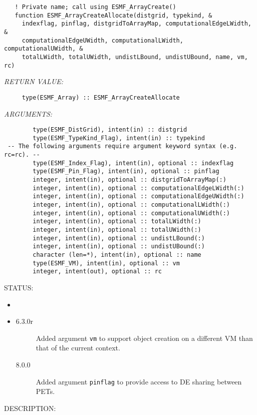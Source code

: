 \begin{verbatim}   ! Private name; call using ESMF_ArrayCreate()
   function ESMF_ArrayCreateAllocate(distgrid, typekind, &
     indexflag, pinflag, distgridToArrayMap, computationalEdgeLWidth, &
     computationalEdgeUWidth, computationalLWidth, computationalUWidth, &
     totalLWidth, totalUWidth, undistLBound, undistUBound, name, vm, rc)\end{verbatim}{\em RETURN VALUE:}
\begin{verbatim}     type(ESMF_Array) :: ESMF_ArrayCreateAllocate\end{verbatim}{\em ARGUMENTS:}
\begin{verbatim}        type(ESMF_DistGrid), intent(in) :: distgrid
        type(ESMF_TypeKind_Flag), intent(in) :: typekind
 -- The following arguments require argument keyword syntax (e.g. rc=rc). --
        type(ESMF_Index_Flag), intent(in), optional :: indexflag
        type(ESMF_Pin_Flag), intent(in), optional :: pinflag
        integer, intent(in), optional :: distgridToArrayMap(:)
        integer, intent(in), optional :: computationalEdgeLWidth(:)
        integer, intent(in), optional :: computationalEdgeUWidth(:)
        integer, intent(in), optional :: computationalLWidth(:)
        integer, intent(in), optional :: computationalUWidth(:)
        integer, intent(in), optional :: totalLWidth(:)
        integer, intent(in), optional :: totalUWidth(:)
        integer, intent(in), optional :: undistLBound(:)
        integer, intent(in), optional :: undistUBound(:)
        character (len=*), intent(in), optional :: name
        type(ESMF_VM), intent(in), optional :: vm
        integer, intent(out), optional :: rc\end{verbatim}
{\sf STATUS:}
   \begin{itemize}
   \item{}
   \item{}
   \begin{description}
   \item[6.3.0r] Added argument {\tt vm} to support object creation on a
   different VM than that of the current context.
   \item[8.0.0] Added argument {\tt pinflag} to provide access to DE sharing
   between PETs.
   \end{description}
   \end{itemize}
  
{\sf DESCRIPTION:\\ }


